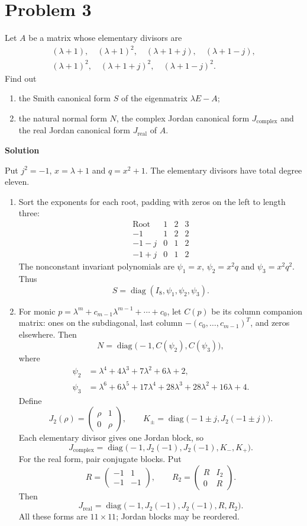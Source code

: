 \documentclass[UTF8,10pt,letterpaper,fontset=fandol]{ctexart}
\newcommand{\Solution}{\par\Needspace{4\baselineskip}\textbf{Solution}\par}
\begin{document}
\section{Problem 3}
Let $A$ be a matrix whose elementary divisors are
\[
\begin{gathered}
(\lambda+1),\quad(\lambda+1)^2,\quad(\lambda+1+j),\quad(\lambda+1-j),\\
(\lambda+1)^2,\quad(\lambda+1+j)^2,\quad(\lambda+1-j)^2.
\end{gathered}
\]
Find out
\begin{enumerate}
\item the Smith canonical form $S$ of the eigenmatrix $\lambda E-A$;
\item the natural normal form $N$, the complex Jordan canonical form $J_{\mathrm{complex}}$ and the real Jordan canonical form $J_{\mathrm{real}}$ of $A$.
\end{enumerate}
\Solution
Put $j^2=-1$, $x=\lambda+1$ and $q=x^2+1$. The elementary divisors have total degree eleven.
\begin{enumerate}
\item Sort the exponents for each root, padding with zeros on the left to length three:
\[
\begin{array}{c|ccc}
\text{Root}&1&2&3\\\hline
-1&1&2&2\\
-1-j&0&1&2\\
-1+j&0&1&2
\end{array}
\]
The nonconstant invariant polynomials are $\psi_1=x$, $\psi_2=x^2q$ and $\psi_3=x^2q^2$. Thus
\[
\boxed{S=\operatorname{diag}(I_8,\psi_1,\psi_2,\psi_3)}.
\]
\item For monic $p=\lambda^m+c_{m-1}\lambda^{m-1}+\cdots+c_0$, let $C(p)$ be its column companion matrix: ones on the subdiagonal, last column $-(c_0,\ldots,c_{m-1})^T$, and zeros elsewhere. Then
\[
\boxed{N=\operatorname{diag}\bigl(-1,C(\psi_2),C(\psi_3)\bigr)},
\]
where
\[
\begin{aligned}
\psi_2&=\lambda^4+4\lambda^3+7\lambda^2+6\lambda+2,\\
\psi_3&=\lambda^6+6\lambda^5+17\lambda^4+28\lambda^3+28\lambda^2+16\lambda+4.
\end{aligned}
\]
Define
\[
J_2(\rho)=\begin{pmatrix}\rho&1\\0&\rho\end{pmatrix},\qquad
K_\pm=\operatorname{diag}\bigl(-1\pm j,J_2(-1\pm j)\bigr).
\]
Each elementary divisor gives one Jordan block, so
\[
\boxed{J_{\mathrm{complex}}=\operatorname{diag}\bigl(-1,J_2(-1),J_2(-1),K_-,K_+\bigr)}.
\]
For the real form, pair conjugate blocks. Put
\[
R=\begin{pmatrix}-1&1\\-1&-1\end{pmatrix},\qquad
R_2=\begin{pmatrix}R&I_2\\0&R\end{pmatrix}.
\]
Then
\[
\boxed{J_{\mathrm{real}}=\operatorname{diag}\bigl(-1,J_2(-1),J_2(-1),R,R_2\bigr)}.
\]
All these forms are $11\times11$; Jordan blocks may be reordered.
\end{enumerate}
\end{document}
